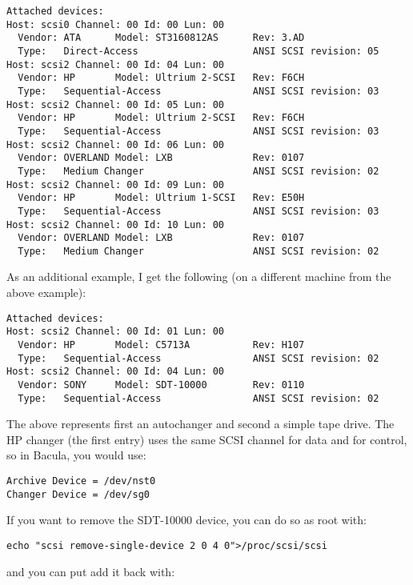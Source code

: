 \footnotesize       
\begin{verbatim}
Attached devices:
Host: scsi0 Channel: 00 Id: 00 Lun: 00
  Vendor: ATA      Model: ST3160812AS      Rev: 3.AD
  Type:   Direct-Access                    ANSI SCSI revision: 05
Host: scsi2 Channel: 00 Id: 04 Lun: 00
  Vendor: HP       Model: Ultrium 2-SCSI   Rev: F6CH
  Type:   Sequential-Access                ANSI SCSI revision: 03
Host: scsi2 Channel: 00 Id: 05 Lun: 00
  Vendor: HP       Model: Ultrium 2-SCSI   Rev: F6CH
  Type:   Sequential-Access                ANSI SCSI revision: 03
Host: scsi2 Channel: 00 Id: 06 Lun: 00
  Vendor: OVERLAND Model: LXB              Rev: 0107
  Type:   Medium Changer                   ANSI SCSI revision: 02
Host: scsi2 Channel: 00 Id: 09 Lun: 00
  Vendor: HP       Model: Ultrium 1-SCSI   Rev: E50H
  Type:   Sequential-Access                ANSI SCSI revision: 03
Host: scsi2 Channel: 00 Id: 10 Lun: 00
  Vendor: OVERLAND Model: LXB              Rev: 0107
  Type:   Medium Changer                   ANSI SCSI revision: 02
\end{verbatim}
\normalsize


As an additional example, I get the following (on a different machine from the
above example):

\footnotesize
\begin{verbatim}
Attached devices:
Host: scsi2 Channel: 00 Id: 01 Lun: 00
  Vendor: HP       Model: C5713A           Rev: H107
  Type:   Sequential-Access                ANSI SCSI revision: 02
Host: scsi2 Channel: 00 Id: 04 Lun: 00
  Vendor: SONY     Model: SDT-10000        Rev: 0110
  Type:   Sequential-Access                ANSI SCSI revision: 02
\end{verbatim}
\normalsize

The above represents first an autochanger and second a simple
tape drive. The HP changer (the first entry) uses the same SCSI channel
for data and for control, so in Bacula, you would use: 
\footnotesize
\begin{verbatim}
Archive Device = /dev/nst0
Changer Device = /dev/sg0
\end{verbatim}
\normalsize

If you want to remove the SDT-10000 device, you can do so as root with: 

\footnotesize
\begin{verbatim}
echo "scsi remove-single-device 2 0 4 0">/proc/scsi/scsi
\end{verbatim}
\normalsize

and you can put add it back with: 

